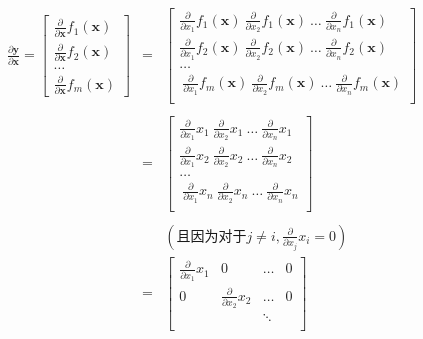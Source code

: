 \documentclass[lang=cn,newtx,10pt,scheme=chinese]{elegantbook}
\begin{document}
\begin{center}

\begin{eqnarray*}
	\frac{\partial \mathbf{y}}{\partial \mathbf{x}} = \begin{bmatrix}
	\frac{\partial}{\partial \mathbf{x}} f_1(\mathbf{x}) \\
	\frac{\partial}{\partial \mathbf{x}} f_2(\mathbf{x})\\
	\ldots\\
	\frac{\partial}{\partial \mathbf{x}} f_m(\mathbf{x})
	\end{bmatrix} &=& \begin{bmatrix}
	\frac{\partial}{\partial {x_1}} f_1(\mathbf{x})~ \frac{\partial}{\partial {x_2}} f_1(\mathbf{x}) ~\ldots~  \frac{\partial}{\partial {x_n}} f_1(\mathbf{x}) \\
	\frac{\partial}{\partial {x_1}} f_2(\mathbf{x})~ \frac{\partial}{\partial {x_2}} f_2(\mathbf{x}) ~\ldots~  \frac{\partial}{\partial {x_n}} f_2(\mathbf{x}) \\
	\ldots\\
	~\frac{\partial}{\partial {x_1}} f_m(\mathbf{x})~ \frac{\partial}{\partial {x_2}} f_m(\mathbf{x}) ~\ldots~ \frac{\partial}{\partial {x_n}} f_m(\mathbf{x}) \\
	\end{bmatrix}\\\\
	& = & \begin{bmatrix}
	\frac{\partial}{\partial {x_1}} x_1~ \frac{\partial}{\partial {x_2}} x_1 ~\ldots~ \frac{\partial}{\partial {x_n}} x_1 \\
	\frac{\partial}{\partial {x_1}} x_2~ \frac{\partial}{\partial {x_2}} x_2 ~\ldots~ \frac{\partial}{\partial {x_n}} x_2 \\
	\ldots\\
	~\frac{\partial}{\partial {x_1}} x_n~ \frac{\partial}{\partial {x_2}} x_n ~\ldots~ \frac{\partial}{\partial {x_n}} x_n \\
	\end{bmatrix}\\\\
	& & (\text{且因为对于} j \neq i, \frac{\partial}{\partial {x_j}} x_i = 0)\\
	 & = & \begin{bmatrix}
	\frac{\partial}{\partial {x_1}} x_1 & 0 & \ldots& 0 \\
	0 & \frac{\partial}{\partial {x_2}} x_2 &\ldots & 0 \\
	& & \ddots\\

\end{bmatrix}
\end{eqnarray*}
\end{center}
\end{document}
